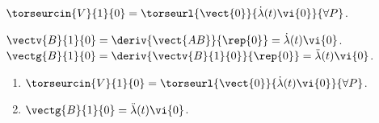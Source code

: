 \begin{corrigebox}
$\torseurcin{V}{1}{0} = \torseurl{\vect{0}}{\dot{\lambda}(t)\vi{0}}{\forall P}$.

$\vectv{B}{1}{0} = \deriv{\vect{AB}}{\rep{0}}=\dot{\lambda}(t)\vi{0}$.
$\vectg{B}{1}{0} = \deriv{\vectv{B}{1}{0}}{\rep{0}}=\ddot{\lambda}(t)\vi{0}$.

\begin{enumerate}
\item $\torseurcin{V}{1}{0} = \torseurl{\vect{0}}{\dot{\lambda}(t)\vi{0}}{\forall P}$.
\item  $\vectg{B}{1}{0} =\ddot{\lambda}(t)\vi{0}$.
\end{enumerate}
\end{corrigebox}
